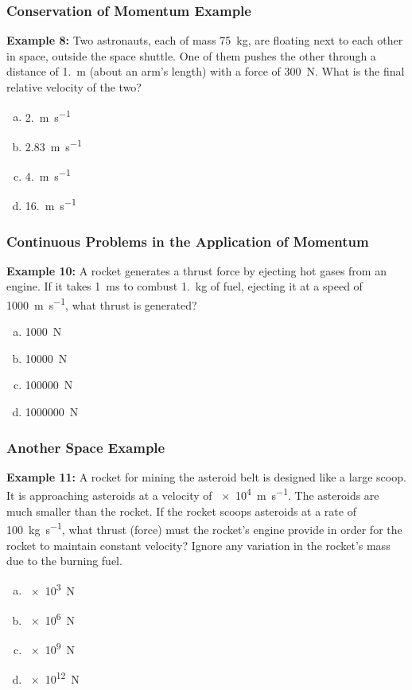\documentclass[12pt,compress,aspectratio=169]{beamer}
\begin{document}
\begin{frame}
  \frametitle{Conservation of Momentum Example}
  \textbf{Example 8:} Two astronauts, each of mass \SI{75}{\kilo\gram}, are
  floating next to each other in space, outside the space shuttle. One of them
  pushes the other through a distance of \SI{1.}{\metre} (about an arm's
  length) with a force of \SI{300}{\newton}. What is the final relative
  velocity of the two?
  \begin{enumerate}[(a)]
  \item \SI{2.}{\metre\per\second}
  \item \SI{2.83}{\metre\per\second}
  \item \SI{4.}{\metre\per\second}
  \item \SI{16.}{\metre\per\second}
  \end{enumerate}
\end{frame}

\begin{frame}
  \frametitle{Continuous Problems in the Application of Momentum}

%
  \textbf{Example 10:} A rocket generates a thrust force by ejecting hot gases
  from an engine. If it takes \SI{1}{\milli\second} to combust
  \SI{1.}{\kilo\gram} of fuel, ejecting it at a speed of
  \SI{1000}{\metre\per\second}, what thrust is generated?
  \begin{enumerate}[(a)]
  \item \SI{1000}{\newton}
  \item \SI{10000}{\newton}
  \item \SI{100000}{\newton}
  \item \SI{1000000}{\newton}
  \end{enumerate}
\end{frame}

\begin{frame}
  \frametitle{Another Space Example}
  \textbf{Example 11:} A rocket for mining the asteroid belt is designed like a
  large scoop. It is approaching asteroids at a velocity of
  \SI{e4}{\metre\per\second}. The asteroids are much smaller than the rocket.
  If the rocket scoops asteroids at a rate of \SI{100}{\kilo\gram\per\second},
  what thrust (force) must the rocket's engine provide in order for the rocket
  to maintain constant velocity? Ignore any variation in the rocket's mass due
  to the burning fuel.
  \begin{enumerate}[(a)]
  \item \SI{e3}{\newton}
  \item \SI{e6}{\newton}
  \item \SI{e9}{\newton}
  \item \SI{e12}{\newton}
  \end{enumerate}
\end{frame}
\end{document}
